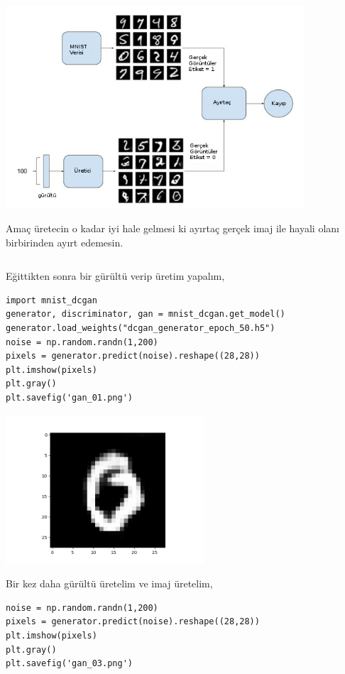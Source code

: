 \documentclass[12pt,fleqn]{article}\usepackage{../../common}
\begin{document}
\includegraphics[width=30em]{gan_07.png}

Amaç üretecin o kadar iyi hale gelmesi ki ayırtaç gerçek imaj ile hayali
olanı birbirinden ayırt edemesin.

\inputminted[fontsize=\footnotesize]{python}{mnist_dcgan.py}

Eğittikten sonra bir gürültü verip üretim yapalım,

\begin{verbatim}
import mnist_dcgan
generator, discriminator, gan = mnist_dcgan.get_model()
generator.load_weights("dcgan_generator_epoch_50.h5")
noise = np.random.randn(1,200)
pixels = generator.predict(noise).reshape((28,28))
plt.imshow(pixels)
plt.gray()
plt.savefig('gan_01.png')
\end{verbatim}

\includegraphics[width=20em]{gan_01.png}

Bir kez daha gürültü üretelim ve imaj üretelim,

\begin{verbatim}
noise = np.random.randn(1,200)
pixels = generator.predict(noise).reshape((28,28))
plt.imshow(pixels)
plt.gray()
plt.savefig('gan_03.png')
\end{verbatim}
\end{document}
